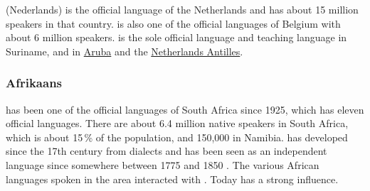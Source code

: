  (Nederlands) is the  official language of the Netherlands and has about 15 million speakers in that country.  is also one of the official languages of Belgium with about 6 million speakers.
 is the sole official language and teaching language in Suriname, 
and in \href{https://en.wikipedia.org/wiki/Aruba}{Aruba} and the \href{https://en.wikipedia.org/wiki/Netherlands_Antilles}{Netherlands Antilles}.


\subsubsection{Afrikaans}

 has been one of the official languages of South Africa since 1925, which has eleven official languages.
There are about 6.4 million native speakers in South Africa, which is about 15\,\% of the population,
and 150,000 in Namibia.  has developed since the 17th century from  dialects and has
been seen as an independent language since somewhere between 1775 and 1850 
\citep[]{denBesten2012a-u}.
The various African languages spoken in the area interacted with .
Today  has a strong influence.



